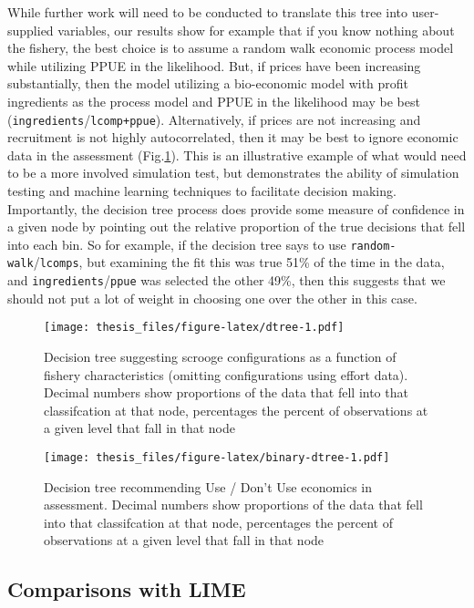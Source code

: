 \documentclass[twoside,12pt,final]{ucthesis-CA2012}
\begin{document}
\begin{ucmainmatter}
While further work will need to be conducted to translate this tree into
user-supplied variables, our results show for example that if you know
nothing about the fishery, the best choice is to assume a random walk
economic process model while utilizing PPUE in the likelihood. But, if
prices have been increasing substantially, then the model utilizing a
bio-economic model with profit ingredients as the process model and PPUE
in the likelihood may be best
(\texttt{ingredients}/\texttt{lcomp+ppue}). Alternatively, if prices are
not increasing and recruitment is not highly autocorrelated, then it may
be best to ignore economic data in the assessment (Fig.\ref{fig:dtree}).
This is an illustrative example of what would need to be a more involved
simulation test, but demonstrates the ability of simulation testing and
machine learning techniques to facilitate decision making. Importantly,
the decision tree process does provide some measure of confidence in a
given node by pointing out the relative proportion of the true decisions
that fell into each bin. So for example, if the decision tree says to
use \texttt{random-walk}/\texttt{lcomps}, but examining the fit this was
true 51\% of the time in the data, and
\texttt{ingredients}/\texttt{ppue} was selected the other 49\%, then
this suggests that we should not put a lot of weight in choosing one
over the other in this case.
\begin{figure}
\centering
\texttt{[image: thesis\_files/figure-latex/dtree-1.pdf]}
\caption{\label{fig:dtree}Decision tree suggesting scrooge configurations as
a function of fishery characteristics (omitting configurations using
effort data). Decimal numbers show proportions of the data that fell
into that classifcation at that node, percentages the percent of
observations at a given level that fall in that node}
\end{figure}
\begin{figure}
\centering
\texttt{[image: thesis\_files/figure-latex/binary-dtree-1.pdf]}
\caption{\label{fig:binary-dtree}Decision tree recommending Use / Don't Use
economics in assessment. Decimal numbers show proportions of the data
that fell into that classifcation at that node, percentages the percent
of observations at a given level that fall in that node}
\end{figure}
\subsection{Comparisons with LIME}\label{comparisons-with-lime}


\end{ucmainmatter}
\end{document}
